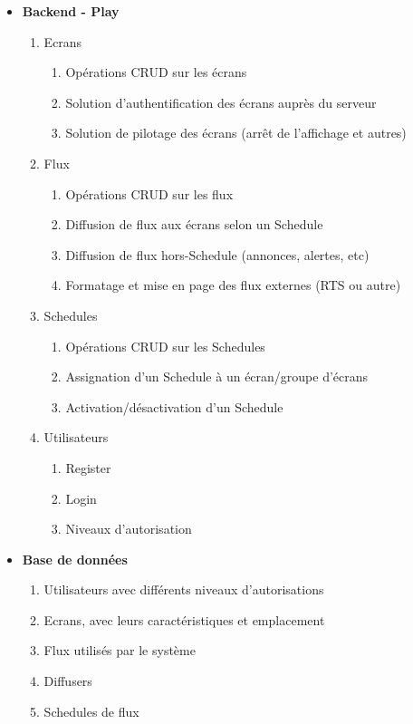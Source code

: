 \documentclass[french]{article}
\begin{document}
\begin{appendices}
\begin{itemize}
\begin{enumerate}
\begin{enumerate}
		\end{enumerate}
		\end{enumerate}
	\item \textbf{Backend - Play}
	\begin{enumerate}
		\item Ecrans
		\begin{enumerate}
			\item Opérations CRUD sur les écrans
			\item Solution d'authentification des écrans auprès du serveur
			\item Solution de pilotage des écrans (arrêt de l'affichage et autres)
		\end{enumerate}
		\item Flux
		\begin{enumerate}
			\item Opérations CRUD sur les flux
			\item Diffusion de flux aux écrans selon un Schedule
			\item Diffusion de flux hors-Schedule (annonces, alertes, etc)
			\item Formatage et mise en page des flux externes (RTS ou autre)
		\end{enumerate}
		\item Schedules
		\begin{enumerate}
			\item Opérations CRUD sur les Schedules
			\item Assignation d'un Schedule à un écran/groupe d'écrans
			\item Activation/désactivation d'un Schedule
		\end{enumerate}
		\item Utilisateurs
		 \begin{enumerate}
			\item Register 
			\item Login 
			\item Niveaux d'autorisation
		\end{enumerate}
	\end{enumerate}
	
	\item \textbf{Base de données}
	\begin{enumerate}
		\item Utilisateurs avec différents niveaux d'autorisations
		\item Ecrans, avec leurs caractéristiques et emplacement
		\item Flux utilisés par le système
		\item Diffusers
		\item Schedules de flux \newline
	\end{enumerate}
\end{itemize}


\end{appendices}
\end{document}

